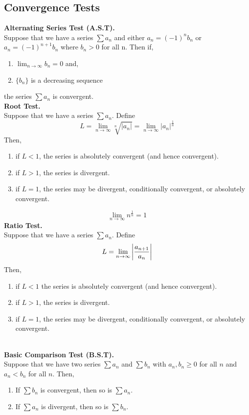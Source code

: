 \documentclass[11pt]{article}
\DeclarePairedDelimiter\abs{\lvert}{\rvert}
\begin{document}
\subsection{Convergence Tests}
\textbf{Alternating Series Test (A.S.T).} \\
Suppose that we have a series $\sum {a_n}$ and either $a_n = (-1)^nb_n$ or $a_n = (-1)^{n + 1}b_n$ where $b_n > 0$ for all n. Then if,
\begin{enumerate}[leftmargin = *, nolistsep]
\item $\lim_{n \to \infty} b_n = 0$ and,
\item$ \{b_n\}$ is a decreasing sequence
\end{enumerate}
the series $\sum a_n$ is convergent. \\
\newline
\textbf{Root Test.} \\
Suppose that we have a series $\sum {a_n}$. Define 
$$L = \lim_{n \to \infty} \sqrt[n]{|a_n|} = \lim_{n \to \infty} |a_n|^{\frac{1}{n}}$$
Then, 
\begin{enumerate}[leftmargin = *, nolistsep]
\item if $L < 1$, the series is absolutely convergent (and hence convergent). 
\item if $L > 1$, the series is divergent.  
\item if $L = 1$, the series may be divergent, conditionally convergent, or absolutely convergent. 
\end{enumerate} 
$$ \lim_{n \to \infty}n ^ {\frac{1}{n}} = 1$$ 
\textbf{Ratio Test.} \\
Suppose that we have a series $\sum {a_n}$. Define 
$$L = \lim_{n \to \infty} {\abs*{\frac{a_{n+1}}{a_n}}} $$
Then, 
\begin{enumerate}[leftmargin = *, nolistsep] 
\item if $L < 1$ the series is absolutely convergent (and hence convergent). 
\item if $L > 1$, the series is divergent.  
\item if $L = 1$, the series may be divergent, conditionally convergent, or absolutely convergent. 
\end{enumerate}
\  \\
\textbf{Basic Comparison Test (B.S.T).} \\
Suppose that we have two series $\sum {a_n}$ and $\sum {b_n}$ with $a_n, b_n \geqslant 0$ for all $n$ and $a_n < b_n$ for all $n$. Then, 
\begin{enumerate}[leftmargin = *, nolistsep]
\item If $\sum{b_n}$ is convergent, then so is $\sum a_n$. 
\item If $\sum{a_n}$ is divergent, then so is $\sum b_n$.
\end{enumerate}
\end{document}
